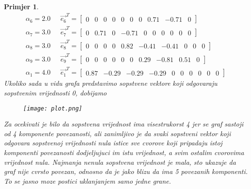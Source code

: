 \documentclass[11pt]{article}
\newtheorem{example}{Primjer}
\begin{document}
\begin{example}
\[\begin{split}
			\alpha_6=2.0 \text{     } & \vec{e_6}^T = \begin{bmatrix} 0  &  0  &  0  &  0  &  0  &  0  &  0  &  0.71  &  -0.71  &  0           \end{bmatrix} \\
			\alpha_7=3.0 \text{     } & \vec{e_7}^T = \begin{bmatrix} 0  &  0.71  &  0  &  -0.71  &  0  &  0  &  0  &  0  &  0  &  0           \end{bmatrix} \\
			\alpha_8=3.0 \text{     } & \vec{e_8}^T = \begin{bmatrix} 0  &  0  &  0  &  0  &  0.82  &  -0.41  &  -0.41  &  0  &  0  &  0       \end{bmatrix} \\
			\alpha_9=3.0 \text{     } & \vec{e_9}^T = \begin{bmatrix} 0  &  0  &  0  &  0  &  0  &  0  &  0.29  &  -0.81  &  0.51  &  0        \end{bmatrix} \\
			\alpha_1=4.0 \text{    } & \vec{e_1}^T = \begin{bmatrix} 0.87  &  -0.29  &  -0.29  &  -0.29  &  0  &  0  &  0  &  0  &  0  &  0  \end{bmatrix}
		\end{split}
		\]
		Ukoliko sada u vidu grafa predstavimo sopstvene vektore koji odgovaraju sopstvenim vrijednosti 0, dobijamo
		\pagebreak
		\begin{figure}[h]
			\centering
			\texttt{[image: plot.png]}
		\end{figure}
		
		Za ocekivati je bilo da sopstvena vrijednost ima visestrukorst 4 jer se graf sastoji od 4 komponente povezanosti, ali zanimljivo je
		da svaki sopstveni vektor koji odgovara sopstvenoj vrijednosti nula istice sve cvorove koji pripadaju istoj komponenti povezanosti dodjeljujuci
		im istu vrijednost, a svim ostalim cvorovima vrijednost nula. Najmanja nenula sopstvena vrijednost je mala, sto ukazuje da graf nije cvrsto povezan, odnosno da je
        jako blizu da ima 5 povezanih komponenti. To se jasno moze postici uklanjanjem samo jedne grane.
	\end{example}
\end{document}
